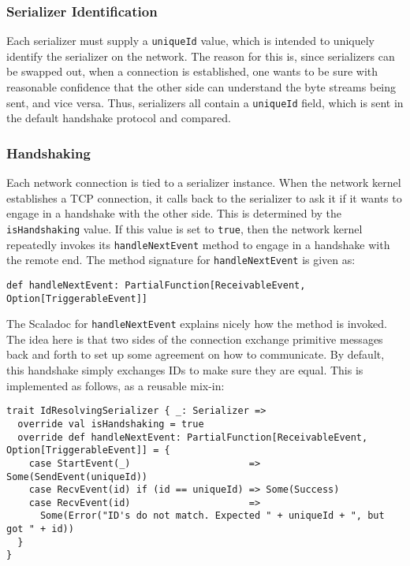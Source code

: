 \documentclass{article}
\begin{document}
\subsubsection{Serializer Identification}
Each serializer must supply a \verb|uniqueId| value, which is intended to uniquely identify the
serializer on the network. The reason for this is, since serializers can be swapped out, when
a connection is established, one wants to be sure with reasonable confidence that the other
side can understand the byte streams being sent, and vice versa. Thus, serializers all contain
a \verb|uniqueId| field, which is sent in the default handshake protocol and compared.

\subsubsection{Handshaking}
Each network connection is tied to a serializer instance. 
When the network kernel establishes a TCP connection, it calls back to the serializer to ask it if
it wants to engage in a handshake with the other side. This is determined by the
\verb|isHandshaking| value. If this value is set to \verb|true|, then the
network kernel repeatedly invokes its \verb|handleNextEvent| method to engage in a handshake
with the remote end. The method signature for \verb|handleNextEvent| is given as:
\begin{verbatim}
def handleNextEvent: PartialFunction[ReceivableEvent, Option[TriggerableEvent]]
\end{verbatim}
The Scaladoc for \verb|handleNextEvent| explains nicely how the method is invoked.
The idea here is that two sides of the connection exchange primitive messages back and forth
to set up some agreement on how to communicate. By default, this handshake simply exchanges
IDs to make sure they are equal. This is implemented as follows, as a reusable mix-in:
\begin{verbatim}
trait IdResolvingSerializer { _: Serializer =>
  override val isHandshaking = true        
  override def handleNextEvent: PartialFunction[ReceivableEvent, Option[TriggerableEvent]] = {                        
    case StartEvent(_)                     => Some(SendEvent(uniqueId))
    case RecvEvent(id) if (id == uniqueId) => Some(Success)                                                           
    case RecvEvent(id)                     => 
      Some(Error("ID's do not match. Expected " + uniqueId + ", but got " + id))     
  }                                                                                                                   
}
\end{verbatim}
\end{document}
